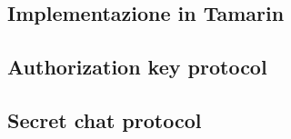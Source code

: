 \begin{appendices}

    \section{Implementazione in Tamarin}
    \subsection{Authorization key protocol}
    

    \subsection{Secret chat protocol}
    

\end{appendices}